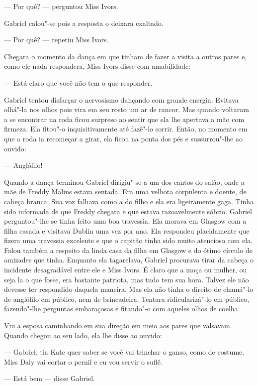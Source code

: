 --- Por quê? --- perguntou Miss Ivors.

Gabriel calou"-se pois a resposta o deixara exaltado.

--- Por quê? --- repetiu Miss Ivors.

Chegara o momento da dança em que tinham de fazer a visita a outros pares e,
como ele nada respondera, Miss Ivors disse com amabilidade:

--- Está claro que você não tem o que responder.

Gabriel tentou disfarçar o nervosismo dançando com grande energia.  Evitava
olhá"-la nos olhos pois vira em seu rosto um ar de rancor.  Mas quando voltaram
a se encontrar na roda ficou surpreso ao sentir que ela lhe apertava a mão com
firmeza.  Ela fitou"-o inquisitivamente até fazê"-lo sorrir.  Então, no momento
em que a roda ia recomeçar a girar, ela ficou na ponta dos pés e sussurrou"-lhe
ao ouvido:

--- Anglófilo!

Quando a dança terminou Gabriel dirigiu"-se a um dos cantos do salão, onde a mãe
de Freddy Malins estava sentada.  Era uma velhota corpulenta e doente, de
cabeça branca.  Sua voz falhava como a do filho e ela era ligeiramente gaga.
Tinha sido informada de que Freddy chegara e que estava razoavelmente sóbrio.
Gabriel perguntou"-lhe se tinha feito uma boa travessia.  Ela morava em Glasgow
com a filha casada e visitava Dublin uma vez por ano.  Ela respondeu
placidamente que fizera uma travessia excelente e que o capitão tinha sido
muito atencioso com ela.  Falou também a respeito da linda casa da filha em
Glasgow e do ótimo círculo de amizades que tinha.  Enquanto ela tagarelava,
Gabriel procurava tirar da cabeça o incidente desagradável entre ele e Miss
Ivors.  É claro que a moça ou mulher, ou seja la o que fosse, era bastante
patriota, mas tudo tem sua hora.  Talvez ele não devesse ter respondido daquela
maneira.  Mas ela não tinha o direito de chamá"-lo de anglófilo em público, nem
de brincadeira.  Tentara ridicularizá"-lo em público, fazendo"-lhe perguntas
embaraçosas e fitando"-o com aqueles olhos de coelha.

Viu a esposa caminhando em sua direção em meio aos pares que valsavam.  Quando
chegou ao seu lado, ela lhe disse ao ouvido:

--- Gabriel, tia Kate quer saber se você vai trinchar o ganso, como de costume.
Miss Daly vai cortar o pernil e eu vou servir o suflê.

--- Está bem --- disse Gabriel.

